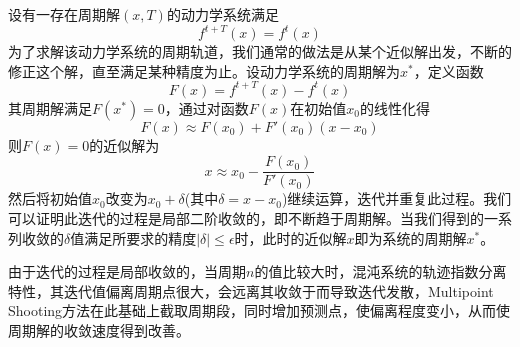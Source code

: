 设有一存在周期解$(x,T)$的动力学系统满足
\begin{equation}
    f^{t+T}(x)=f^t(x)
\end{equation}
为了求解该动力学系统的周期轨道，我们通常的做法是从某个近似解出发，不断的修正这个解，直至满足某种精度为止。设动力学系统的周期解为$x^*$，定义函数
\begin{equation}
    F(x)=f^{t+T}(x)-f^{t}(x)
\end{equation}
其周期解满足$F(x^*)=0$，通过对函数$F(x)$在初始值$x_0$的线性化得
\begin{equation}
    F(x)\approx F(x_0)+F'(x_0)(x-x_0)
\end{equation}
则$F(x)=0$的近似解为
\begin{equation}
    x\approx x_0-\dfrac{F(x_0)}{F'(x_0)}
\end{equation}
然后将初始值$x_0$改变为$x_0+\delta$(其中$\delta=x-x_0$)继续运算，迭代并重复此过程。我们可以证明此迭代的过程是局部二阶收敛的，即不断趋于周期解。当我们得到的一系列收敛的$\delta$值满足所要求的精度$|\delta|\leqslant\epsilon$时，此时的近似解$x$即为系统的周期解$x^*$。

由于迭代的过程是局部收敛的，当周期$n$的值比较大时，混沌系统的轨迹指数分离特性，其迭代值偏离周期点很大，会远离其收敛于而导致迭代发散，Multipoint Shooting方法在此基础上截取周期段，同时增加预测点，使偏离程度变小，从而使周期解的收敛速度得到改善。

